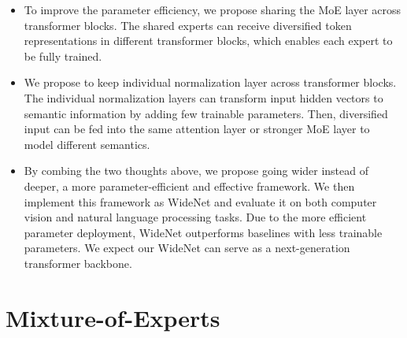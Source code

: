 \documentclass[letterpaper]{article} %
\newcommand{\ie}{\emph{i.e.,}\xspace}
\begin{document}
\begin{itemize}

\item To improve the parameter efficiency, we propose sharing the MoE layer across transformer blocks. The shared experts can receive diversified token representations in different transformer blocks, which enables each expert to be fully trained.



\item We propose to keep individual normalization layer across transformer blocks. The individual normalization layers can transform input hidden vectors to semantic information by adding few trainable parameters. Then, diversified input can be fed into the same attention layer or stronger MoE layer to model different semantics.  



\item By combing the two thoughts above, we propose going wider instead of deeper, a more parameter-efficient and effective framework. We then implement this framework as WideNet and evaluate it on both computer vision and natural language processing tasks. Due to the more efficient parameter deployment, WideNet outperforms baselines with less trainable parameters. We expect our WideNet can serve as a next-generation transformer backbone.




\end{itemize}




\section{Mixture-of-Experts}
\label{sec:moe}
\end{document}
